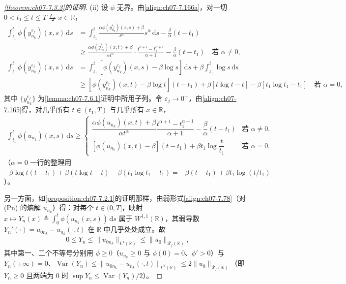 \documentclass[../../main.tex]{subfiles}%
\begin{document}
\begin{proof}[\cref{theorem:ch07-7.3.3}的证明]
(ii) 设 $\phi$ 无界。由\eqref{align:ch07-7.166a}，对一切 $0<t_1\leqslant t\leqslant T$ 与 $x\in\mathbb{R}$，
\begin{align*}
\int_{t_1}^t\phi(y_{n_k}^{\varepsilon_j})(x,s)\,\mathrm{d}s
&=\int_{t_1}^t\frac{\alpha\phi(y_{n_k}^{\varepsilon_j})(x,s)+\beta}{s^\alpha}s^\alpha\,\mathrm{d}s-\frac{\beta}{\alpha}(t-t_1)\\
&\geqslant\frac{\alpha\phi(y_{n_k}^{\varepsilon_j})(x,t)+\beta}{\alpha t^\alpha}\cdot\frac{t^{\alpha+1}-t_1^{\alpha+1}}{\alpha+1}-\frac{\beta}{\alpha}(t-t_1)\quad\text{若 }\alpha\neq0,\\
\int_{t_1}^t\phi(y_{n_k}^{\varepsilon_j})(x,s)\,\mathrm{d}s
&=\int_{t_1}^t[\phi(y_{n_k}^{\varepsilon_j})(x,s)-\beta\log s]\,\mathrm{d}s+\beta\int_{t_1}^t\log s\,\mathrm{d}s\\
&\geqslant[\phi(y_{n_k}^{\varepsilon_j})(x,t)-\beta\log t](t-t_1)+\beta[t\log t-t]-\beta[t_1\log t_1-t_1]\quad\text{若 }\alpha=0,
\end{align*}
其中 $\{y_{n_k}^{\varepsilon_j}\}$ 为\cref{lemma:ch07-7.6.1}证明中所用子列。令 $\varepsilon_j\to0^+$，由\eqref{align:ch07-7.165}得，对几乎所有 $t\in(t_1,T)$ 与几乎所有 $x\in\mathbb{R}$，
\begin{align}
\int_{t_1}^t\phi(u_{n_k})(x,s)\,\mathrm{d}s\geqslant
\begin{cases}
\dfrac{\alpha\phi(u_{n_k})(x,t)+\beta}{\alpha t^\alpha}\dfrac{t^{\alpha+1}-t_1^{\alpha+1}}{\alpha+1}-\dfrac{\beta}{\alpha}(t-t_1)&\text{若 }\alpha\neq0,\\[2mm]
[\phi(u_{n_k})(x,t)-\beta](t-t_1)+\beta t_1\log\dfrac{t}{t_1}&\text{若 }\alpha=0,
\end{cases} 
\label{align:ch07-7.173}
\end{align}
（$\alpha=0$ 一行的整理用 $-\beta\log t(t-t_1)+\beta(t\log t-t)-\beta(t_1\log t_1-t_1)=-\beta(t-t_1)+\beta t_1\log(t/t_1)$）。

另一方面，如\cref{proposition:ch07-7.2.1}的证明那样，由弱形式\eqref{align:ch07-7.78}（对 (Pn) 的熵解 $u_{n_k}$）得：对每个 $t\in(0,T]$，映射 $x\mapsto Y_n(x)\triangleq\int_0^t\phi(u_{n_k}(x,s))\,\mathrm{d}s$ 属于 $W^{1,1}(\mathbb{R})$，其弱导数 $Y_n'(\cdot)=u_{0n_k}-u_{n_k}(\cdot,t)$ 在 $\mathbb{R}$ 中几乎处处成立。故
\begin{align*}
0\leqslant Y_n\leqslant\|u_{0n_k}\|_{L^1(\mathbb{R})}\leqslant\|u_0\|_{\mathscr{R}_f(\mathbb{R})},
\end{align*}
其中第一、二个不等号分别用 $\phi\geqslant0$（$u_{n_k}\geqslant0$ 与 $\phi(0)=0$、$\phi'>0$）与 $Y_n(\pm\infty)=0$、$\operatorname{Var}(Y_n)\leqslant\|u_{0n_k}-u_{n_k}(\cdot,t)\|_{L^1(\mathbb{R})}\leqslant2\|u_0\|_{\mathscr{R}_f(\mathbb{R})}$（即 $Y_n\geqslant0$ 且两端为 $0$ 时 $\sup Y_n\leqslant\operatorname{Var}(Y_n)/2$）。


\end{proof}
\end{document}
